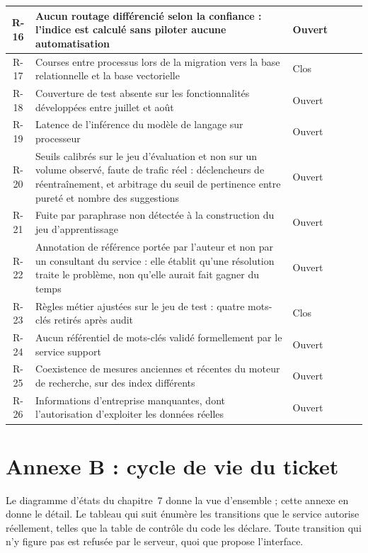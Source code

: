 \begin{center}
\begin{longtable}{|Cp{1.2cm}|Lp{10.6cm}|Cp{2.0cm}|}
\hline
R-16 & Aucun routage différencié selon la confiance : l'indice est calculé sans piloter aucune
automatisation & Ouvert \\
\hline
R-17 & Courses entre processus lors de la migration vers la base relationnelle et la base
vectorielle & Clos \\
\hline
R-18 & Couverture de test absente sur les fonctionnalités développées entre juillet et août &
Ouvert \\
\hline
R-19 & Latence de l'inférence du modèle de langage sur processeur & Ouvert \\
\hline
R-20 & Seuils calibrés sur le jeu d'évaluation et non sur un volume observé, faute de trafic
réel : déclencheurs de réentraînement, et arbitrage du seuil de pertinence entre pureté et nombre
des suggestions & Ouvert \\
\hline
R-21 & Fuite par paraphrase non détectée à la construction du jeu d'apprentissage & Ouvert \\
\hline
R-22 & Annotation de référence portée par l'auteur et non par un consultant du service : elle établit qu'une résolution traite le problème, non qu'elle aurait fait gagner du temps &
Ouvert \\
\hline
R-23 & Règles métier ajustées sur le jeu de test : quatre mots-clés retirés après audit & Clos \\
\hline
R-24 & Aucun référentiel de mots-clés validé formellement par le service support & Ouvert \\
\hline
R-25 & Coexistence de mesures anciennes et récentes du moteur de recherche, sur des index
différents & Ouvert \\
\hline
R-26 & Informations d'entreprise manquantes, dont l'autorisation d'exploiter les données réelles &
Ouvert \\
\hline
\end{longtable}
\end{center}

\FloatBarrier

\section*{Annexe B : cycle de vie du ticket}
\renewcommand{\thetable}{B.\arabic{table}}
\setcounter{table}{0}

Le diagramme d'états du chapitre~7 donne la vue d'ensemble ; cette annexe en donne le détail. Le
tableau qui suit énumère les transitions que le service autorise réellement, telles que la table de
contrôle du code les déclare. Toute transition qui n'y figure pas est refusée par le serveur, quoi
que propose l'interface.

